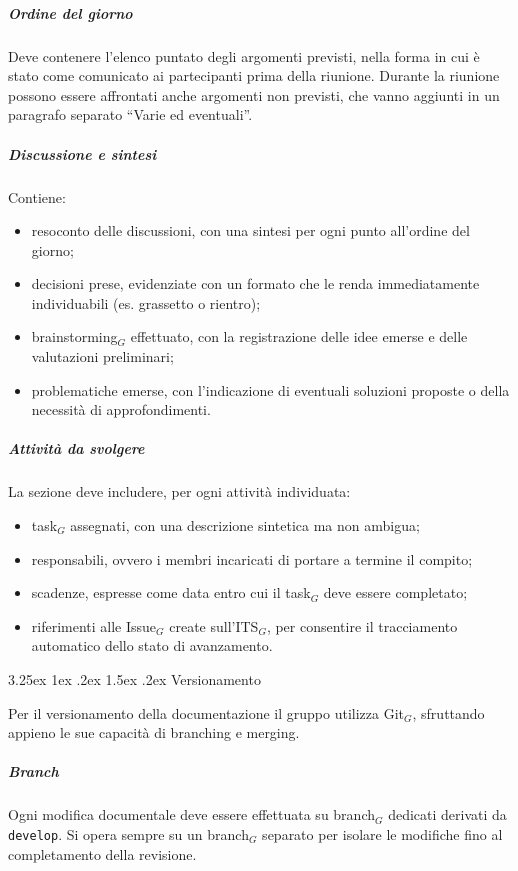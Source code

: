 \documentclass[a4paper, 10pt]{article}
\makeatletter
\renewcommand\paragraph{\@startsection{paragraph}{4}{\z@}%
  {3.25ex \@plus1ex \@minus .2ex}%
  {1.5ex \@plus .2ex}%
  {\normalfont\normalsize\bfseries}}
\makeatother
\begin{document}
\subparagraph{Ordine del giorno}

Deve contenere l'elenco puntato degli argomenti previsti, nella forma in cui è stato come comunicato ai partecipanti prima della riunione. Durante la riunione possono essere affrontati anche argomenti non previsti, che vanno aggiunti in un paragrafo separato “Varie ed eventuali”.

\subparagraph{Discussione e sintesi}

Contiene:
\begin{itemize}
    \item resoconto delle discussioni, con una sintesi per ogni punto all'ordine del giorno;
    \item decisioni prese, evidenziate con un formato che le renda immediatamente individuabili (es. grassetto o rientro);
    \item brainstorming$_G$ effettuato, con la registrazione delle idee emerse e delle valutazioni preliminari;
    \item problematiche emerse, con l'indicazione di eventuali soluzioni proposte o della necessità di approfondimenti.
\end{itemize}

\subparagraph{Attività da svolgere}

La sezione deve includere, per ogni attività individuata:
\begin{itemize}
    \item task$_G$ assegnati, con una descrizione sintetica ma non ambigua;
    \item responsabili, ovvero i membri incaricati di portare a termine il compito;
    \item scadenze, espresse come data entro cui il task$_G$ deve essere completato;
    \item riferimenti alle Issue$_G$ create sull'ITS$_G$, per consentire il tracciamento automatico dello stato di avanzamento.
\end{itemize}

\paragraph{Versionamento}

Per il versionamento della documentazione il gruppo utilizza Git$_G$, sfruttando appieno le sue capacità di branching e merging.

\subparagraph{Branch}

Ogni modifica documentale deve essere effettuata su branch$_G$ dedicati derivati da \texttt{develop}. Si opera sempre su un branch$_G$ separato per isolare le modifiche fino al completamento della revisione.
\end{document}
